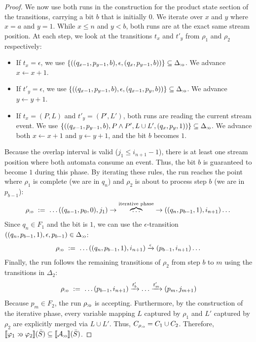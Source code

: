 \begin{proof}
We now use both runs in the construction for the product state section of the transitions, carrying a bit $b$ that is initially $0$. We iterate over $x$ and $y$ where $x = a$ and $y = 1$. While $x \leq n$ and $y < b$, both runs are at the exact same stream position. At each step, we look at the transitions $t_x$ and $t'_y$ from $\rho_1$ and $\rho_2$ respectively:
\begin{itemize}
	\item If $t_x = \epsilon$, we use $\{((q_{x-1}, p_{y-1}, b), \epsilon, (q_{x}, p_{y-1}, b))\} \subseteq \Delta_{\text{:o}}$. We advance $x \gets x+1$.
	\item If $t'_y = \epsilon$, we use $\{((q_{x-1}, p_{y-1}, b), \epsilon, (q_{x-1}, p_{y}, b))\} \subseteq \Delta_{\text{:o}}$. We advance $y \gets y+1$.
	\item If $t_x = (P, L)$ and $t'_y = (P', L')$, both runs are reading the current stream event. We use $\{((q_{x-1}, p_{y-1}, b), P \land P', L \cup L', (q_{x}, p_{y}, 1))\} \subseteq \Delta_{\text{:o}}$. We advance both $x \gets x+1$ and $y \gets y+1$, and the bit $b$ becomes $1$.
\end{itemize}
Because the overlap interval is valid ($j_1 \leq i_{n+1}-1$), there is at least one stream position where both automata consume an event. Thus, the bit $b$ is guaranteed to become $1$ during this phase.
By iterating these rules, the run reaches the point where $\rho_1$ is complete (we are in $q_n$) and $\rho_2$ is about to process step $b$ (we are in $p_{b-1}$):
\[ 
\rho_{\text{:o}} \ := \ \dots ((q_{a-1}, p_0, 0), j_1) \rightarrow \overbrace{\dots}^{\text{iterative phase}} \rightarrow ((q_{n}, p_{b-1}, 1), i_{n+1})  \dots
\]
Since $q_{n} \in F_1$ and the bit is $1$, we can use the $\epsilon$-transition $((q_{n}, p_{b-1}, 1), \epsilon, p_{b-1}) \in \Delta_{\text{:o}}$:
\[ 
\rho_{\text{:o}} \ := \ \dots ((q_{n}, p_{b-1}, 1), i_{n+1}) \xrightarrow{\epsilon} (p_{b-1}, i_{n+1})  \dots 
\]
Finally, the run follows the remaining transitions of $\rho_2$ from step $b$ to $m$ using the transitions in $\Delta_2$:
\[ \rho_{\text{:o}} \ := \ \dots (p_{b-1}, i_{n+1}) \xrightarrow{t'_b} \dots \xrightarrow{t'_m} (p_{m}, j_{m+1}) \]
Because $p_{m} \in F_2$, the run $\rho_{\text{:o}}$ is accepting. Furthermore, by the construction of the iterative phase, every variable mapping $L$ captured by $\rho_1$ and $L'$ captured by $\rho_2$ are explicitly merged via $L \cup L'$. Thus, $C_{\rho_{\text{:o}}} = C_1 \cup C_2$. Therefore, $\sem{\varphi_1 \overlap \varphi_2}(\Stream) \subseteq \sem{\cAoverlap}(\Stream)$.


\end{proof}
